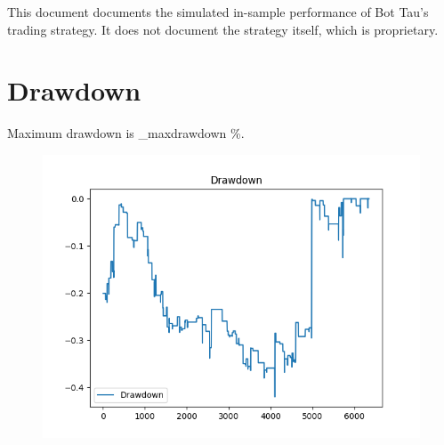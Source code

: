 \documentclass[a4paper]{article}
\title{\documenttitle}
\date{\today}
\author{Frans Englich \\
        \href{mailto:fenglich@fastmail.fm}{fenglich@fastmail.fm}}
\begin{document}
\maketitle

This document documents the simulated in-sample performance of Bot Tau's trading
strategy. It does not document the strategy itself, which is proprietary.

\section{Drawdown}

Maximum drawdown is \constant_maxdrawdown \%.

\begin{figure}
    \begin{center}
        \includegraphics{../generated/drawdown.png}
    \end{center}
\end{figure}

\end{document}

